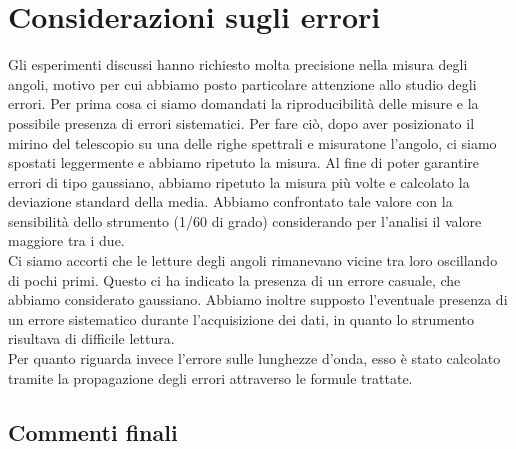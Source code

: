 \documentclass[letterpaper,12pt]{article}
\begin{document}
\section{Considerazioni sugli errori}
\label{sec:errori}
Gli esperimenti discussi hanno richiesto molta precisione nella misura degli angoli, motivo per cui abbiamo posto particolare
attenzione allo studio degli errori. Per prima cosa ci siamo domandati la riproducibilità delle misure e la possibile presenza di errori sistematici.
Per fare ciò, dopo aver posizionato il mirino del telescopio su una delle righe spettrali e misuratone l'angolo, ci siamo spostati
leggermente e abbiamo ripetuto la misura. Al fine di poter garantire errori di tipo gaussiano, abbiamo ripetuto la misura
più volte e calcolato la deviazione standard della media. Abbiamo confrontato tale valore con la sensibilità dello strumento (1/60 di grado)
considerando per l'analisi il valore maggiore tra i due. \\
Ci siamo accorti che le letture degli angoli rimanevano vicine tra loro oscillando di pochi primi. Questo ci ha indicato
la presenza di un errore casuale, che abbiamo considerato gaussiano. Abbiamo inoltre supposto l'eventuale presenza di un errore
sistematico durante l'acquisizione dei dati, in quanto lo strumento risultava di difficile lettura. \\ 
Per quanto riguarda invece l'errore sulle lunghezze d'onda, esso è stato calcolato tramite la propagazione degli errori
attraverso le formule trattate.

\subsection{Commenti finali}
\end{document}
